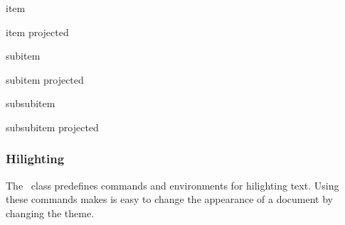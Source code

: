 \begin{element}{item}\no\yes\yes
\end{element}

\begin{element}{item projected}\no\yes\yes
\end{element}

\begin{element}{subitem}\no\yes\yes
\end{element}

\begin{element}{subitem projected}\no\yes\yes
\end{element}

\begin{element}{subsubitem}\no\yes\yes
\end{element}

\begin{element}{subsubitem projected}\no\yes\yes
\end{element}




\subsubsection{Hilighting}

The \beamer\ class predefines commands and environments for
hilighting text. Using these commands makes is easy to change the
appearance of a document by changing the theme. 


